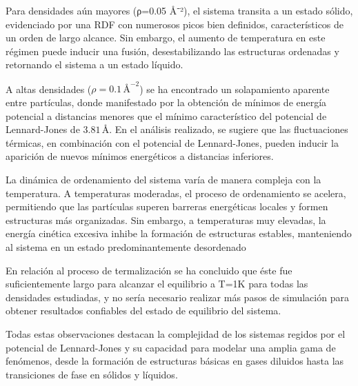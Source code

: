 \vspace{\baselineskip}

Para densidades aún mayores (ρ=0.05 Å⁻²), el sistema transita a un estado sólido, evidenciado por una RDF con numerosos picos bien definidos, característicos de un orden de largo alcance. Sin embargo, el aumento de temperatura en este régimen puede inducir una fusión, desestabilizando las estructuras ordenadas y retornando el sistema a un estado líquido.

\vspace{\baselineskip}



A altas densidades  (\(\rho = 0.1 \, \text{Å}^{-2}\)) se ha encontrado un solapamiento aparente  entre partículas, donde manifestado por la obtención de mínimos de energía potencial a distancias menores que el mínimo característico del potencial de Lennard-Jones de \(3.81 \, \text{Å}\). En el análisis realizado, se sugiere que las fluctuaciones térmicas, en combinación con el potencial de Lennard-Jones, pueden inducir la aparición de nuevos mínimos energéticos a distancias inferiores.

\vspace{\baselineskip}

La dinámica de ordenamiento del sistema varía de manera compleja con la temperatura. A temperaturas moderadas, el proceso de ordenamiento se acelera, permitiendo que las partículas superen barreras energéticas locales y formen estructuras más organizadas. Sin embargo, a temperaturas muy elevadas, la energía cinética excesiva inhibe la formación de estructuras estables, manteniendo al sistema en un estado predominantemente desordenado


\vspace{\baselineskip}
En relación al proceso de termalización se ha  concluido que éste fue suficientemente largo para alcanzar el equilibrio a T=1K para todas las densidades estudiadas, y no sería necesario realizar más pasos de simulación para obtener resultados confiables del estado de equilibrio del sistema.


\vspace{\baselineskip}

Todas estas observaciones destacan la complejidad  de los sistemas regidos por el potencial de Lennard-Jones y su capacidad para modelar una amplia gama de fenómenos, desde la formación de estructuras básicas en gases diluidos hasta las transiciones de fase en sólidos y líquidos. 

\vspace{\baselineskip}


